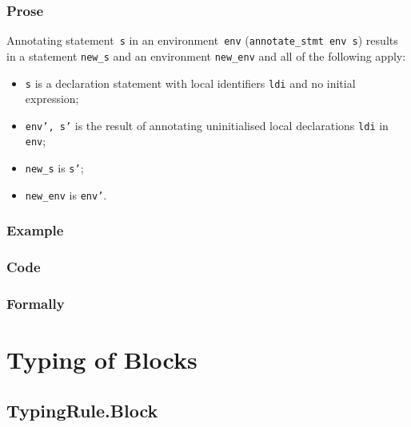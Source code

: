 \documentclass{book}
\begin{document}
  \subsection{Prose}
Annotating statement~\texttt{s} in an environment~\texttt{env}
(\texttt{annotate\_stmt env s}) results in a statement \texttt{new\_s} and an
environment \texttt{new\_env} and all of the following apply:
   \begin{itemize}
   \item \texttt{s} is a declaration statement with local identifiers \texttt{ldi} and no initial expression;
   \item \texttt{env', s'} is the result of annotating uninitialised local declarations \texttt{ldi} in \texttt{env};
   \item \texttt{new\_s} is \texttt{s'};
   \item \texttt{new\_env} is \texttt{env'}.
   \end{itemize}

  \subsection{Example}

  \subsection{Code}

\begin{emptyformal}
    \subsection{Formally}
\end{emptyformal}


\chapter{Typing of Blocks}

\section{TypingRule.Block \label{sec:TypingRule.Block}}
    
\end{document}
